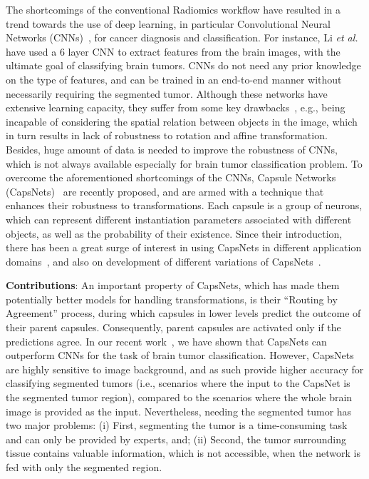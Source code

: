 \documentclass{article}
\begin{document}
The shortcomings of the conventional Radiomics workflow have resulted in a trend towards the use of deep learning, in particular Convolutional Neural Networks (CNNs)~\cite{Alex:2012}, for cancer diagnosis and classification. For instance, Li \textit{et al.} \cite{Li:2017} have used a $6$ layer CNN to extract features from the brain images, with the ultimate goal of classifying brain tumors. CNNs do not need any prior knowledge on the type of features, and can be trained in an end-to-end manner without necessarily requiring the segmented tumor. Although these networks have extensive learning capacity, they suffer from some key drawbacks~\cite{Hinton:2017, Hinton:2018}, e.g., being incapable of considering the spatial relation between objects in the image, which in turn results in lack of robustness to rotation and affine transformation. Besides, huge amount of data is needed to improve the robustness of CNNs, which is not always available especially for brain tumor classification problem. To overcome the aforementioned shortcomings of the CNNs, Capsule Networks (CapsNets)~\cite{Hinton:2017, Hinton:2018} are recently proposed, and are armed with a technique that enhances their robustness to transformations. Each capsule is a group of neurons, which can represent different instantiation parameters associated with different objects, as well as the probability of their existence. Since their introduction, there has been a great surge of interest in using CapsNets in different application domains~\cite{Parnian:ICIP18, LaLonde:2018, Mobiny:2018}, and also on development of different variations of CapsNets~\cite{Xiang:2018, Chen:2018, Jaiswal:2018, Bahadori:2018, Neill:2018}.

\vspace{.025in}
\noindent
\textbf{Contributions}: An important property of CapsNets, which has made them potentially better models for handling transformations, is their ``Routing by Agreement'' process, during which capsules in lower levels predict the outcome of their parent capsules. Consequently, parent capsules are activated only if the predictions agree. In our recent work~\cite{Parnian:ICIP18}, we have shown that CapsNets can outperform CNNs for the task of brain tumor classification. However, CapsNets are highly sensitive to image background, and as such provide higher accuracy for classifying segmented tumors (i.e., scenarios where the input to the CapsNet is the segmented tumor region), compared to the scenarios where the whole brain image is provided as the input. Nevertheless, needing the segmented tumor has two major problems: (i) First, segmenting the tumor is a time-consuming task and can only be provided by experts, and; (ii) Second, the tumor surrounding tissue contains valuable information, which is not accessible, when the network is fed with only the segmented region.
\end{document}
